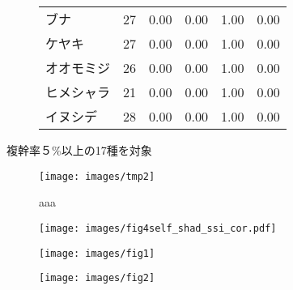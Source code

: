 \documentclass[a0, 30pt, plainboxedsections, draft]{sciposter} %
\renewcommand{\baselinestretch}{1.2}
\begin{document}
\begin{multicols}{2}
\begin{mdframed}[style=subsection.frame,frametitle={\textbf{\huge{\ding{192}}\LARGE{25種の株構造は種間で大きく異なる}}}]
\begin{figure}
\begin{minipage}{0.5\hsize}
\begin{table}
{\begin{tabular}{llrrrr}
\rowcolor{Orange1!30}ブナ &  27 & 0.00 & 0.00 & 1.00 & 0.00 \\ 
\rowcolor{Orange1!30}ケヤキ &  27 & 0.00 & 0.00 & 1.00 & 0.00 \\ 
\rowcolor{Orange1!30}オオモミジ &  26 & 0.00 & 0.00 & 1.00 & 0.00 \\ 
\rowcolor{Orange1!30}ヒメシャラ &  21 & 0.00 & 0.00 & 1.00 & 0.00 \\ 
\rowcolor{Orange1!30}イヌシデ &  28 & 0.00 & 0.00 & 1.00 & 0.00 \\ 
   \hline
\end{tabular}}
\end{table}
 \end{minipage}
\end{figure}


\end{mdframed}

\renewcommand{\baselinestretch}{0.8}
\begin{mdframed}[style=subsection.frame,frametitle=\textbf{\huge{\ding{194}}\LARGE{萌芽性が強い種ほど自己被陰率が下がる}}]
\renewcommand{\baselinestretch}{1.2}

複幹率５\%以上の17種を対象

\begin{figure}
 \begin{minipage}{0.3\hsize}
  \centering
   \texttt{[image: images/tmp2]}
   
   aaa
 \end{minipage}
 \begin{minipage}{0.67\hsize}
  \centering
   \texttt{[image: images/fig4self\_shad\_ssi\_cor.pdf]}   
 \end{minipage}
\end{figure}

\end{mdframed}

\columnbreak
\renewcommand{\baselinestretch}{0.8}
\begin{mdframed}[style=subsection.frame,frametitle=\textbf{\huge{\ding{193}}\LARGE{萌芽性が強くなるほど樹高が低くなる}}]
\renewcommand{\baselinestretch}{1.2} %

\begin{figure}
	\centering
		\texttt{[image: images/fig1]} %
\end{figure}

\begin{figure}
	\centering
		\texttt{[image: images/fig2]} %
\end{figure}

\end{mdframed}

\end{multicols}

\end{document}
